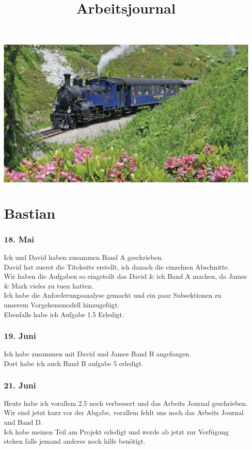 \documentclass[10pt]{article}
\title{Arbeitsjournal}
\begin{document}
	\maketitle
	\includegraphics[width=17.5cm]{title}
	\pagebreak
	\tableofcontents
	\pagebreak
	\section{Bastian}
			\subsubsection{18. Mai}
			Ich und David haben zusammen Band A geschrieben.\\
			David hat zuerst die Titelseite erstellt, ich danach die einzelnen Abschnitte.\\
			Wir haben die Aufgaben so eingeteilt das David \& ich Band A machen, da James \& Mark vieles zu tuen hatten.\\
			Ich habe die Anforderungsanalyse gemacht und ein paar Subsektionen zu unserem Vorgehensmodell hinzugefügt.\\
			Ebenfalls habe ich Aufgabe 1.5 Erledigt.
			
			\subsubsection{19. Juni}
			Ich habe zusammen mit David und James Band B angefangen.\\
			Dort habe ich auch Band B aufgabe 5 erledigt.
			
			\subsubsection{21. Juni}
			Heute habe ich vorallem 2.5 noch verbessert und das Arbeits Journal geschrieben.\\
			Wir sind jetzt kurz vor der Abgabe, vorallem fehlt uns noch das Arbeits Journal und Band D.\\
			Ich habe meinen Teil am Projekt erledigt und werde ab jetzt zur Verfügung stehen falls jemand anderes noch hilfe benötigt.
			
\end{document}
